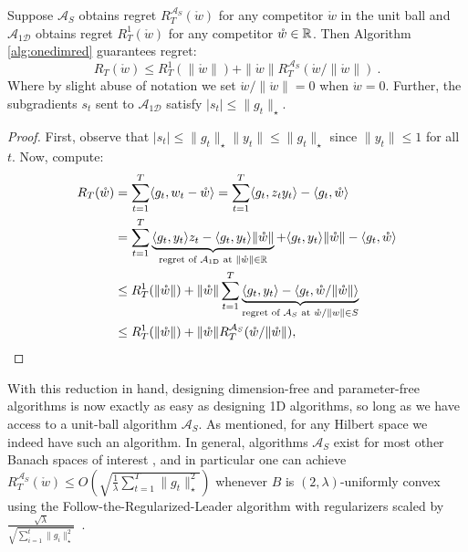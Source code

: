 \documentclass[12pt]{colt2018} %
\newcommand{\bol}{\mathcal{A}_{S}}
\newcommand{\onedol}{\mathcal{A_{\text{1D}}}}
\newcommand{\w}{\mathring{w}}
\begin{document}
\begin{theorem}
Suppose $\bol$ obtains regret $R^{\bol}_T(\w)$ for any competitor $\w$ in the unit ball and $\onedol$ obtains regret $R^1_T(\w)$ for any competitor $\w\in\R$. Then Algorithm \ref{alg:onedimred} guarantees regret:
\[
R_T(\w) \le R^1_T(\|\w\|) + \|\w\|R^{\bol}_T(\w/\|\w\|)~.
\]
Where by slight abuse of notation we set $\w/\|\w\|=0$ when $\w=0$. Further, the subgradients $s_t$ sent to $\onedol$ satisfy $|s_t|\le \|g_t\|_\star$.
\end{theorem}
\begin{proof}
First, observe that $|s_t|\le \|g_t\|_\star\|y_t\|\le \|g_t\|_\star$ since $\|y_t\|\le 1$ for all $t$. Now, compute:
\begin{align*}
R_T(\w)&=\sum_{t=1}^T \langle g_t, w_t-\w\rangle
=\sum_{t=1}^T \langle g_t, z_ty_t\rangle - \langle g_t, \w\rangle\\
&=\sum_{t=1}^T \underbrace{\langle g_t, y_t\rangle z_t - \langle g_t, y_t\rangle \|\w\|}_{\text{regret of }\onedol\text{ at }\|\w\|\in \R} + \langle g_t, y_t\rangle \|\w\|  - \langle g_t, \w\rangle\\
&\le R^1_T(\|\w\|) +\|\w\|\sum_{t=1}^T\underbrace{ \langle g_t, y_t\rangle  -\langle g_t,\w/\|\w\|\rangle}_{\text{regret of }\bol\text{ at }\w/\|w\|\in S}\\
&\le R^1_T(\|\w\|) + \|\w\|R^{\bol}_T(\w/\|\w\|),
\end{align*}
\end{proof}

With this reduction in hand, designing dimension-free and parameter-free algorithms is now exactly as easy as designing 1D algorithms, so long as we have access to a unit-ball algorithm $\bol$. As mentioned, for any Hilbert space we indeed have such an algorithm. In general, algorithms $\bol$ exist for most other Banach spaces of interest \cite{srebro2011universality}, and in particular one can achieve $R^{\bol}_T(\w)\le O\left(\sqrt{\tfrac{1}{\lambda}\sum_{t=1}^T \|g_t\|_\star^2}\right)$ whenever $B$ is $(2,\lambda)$-uniformly convex~\cite{Pinelis15} using the Follow-the-Regularized-Leader algorithm with regularizers scaled by $\tfrac{\sqrt{\lambda}}{\sqrt{\sum_{i=1}^t \|g_i\|_\star^2}}$~\citep{mcmahan2017survey}. 
\end{document}
